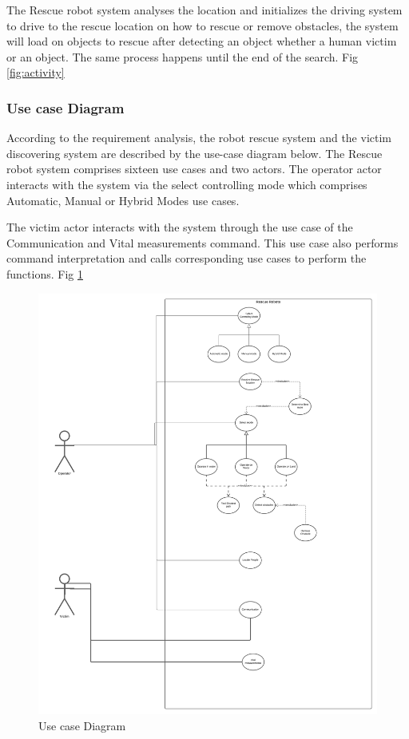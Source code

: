 \documentclass[10pt,journal,compsoc]{IEEEtran}
\begin{document}
The Rescue robot system analyses the location and initializes the driving system to drive to the rescue location on how to rescue or remove obstacles, the system will load on objects to rescue after detecting an object whether a human victim or an object.  The same process happens until the end of the search. Fig \ref{fig:activity}

\subsubsection{Use case Diagram}

According to the requirement analysis, the robot rescue system and the victim discovering system are described by the use-case diagram below. The  Rescue robot system comprises sixteen use cases and two actors. The operator actor interacts with the system via the select controlling mode which comprises Automatic, Manual or Hybrid Modes use cases. 

The victim actor interacts with the system through the use case of the Communication and Vital measurements command. This use case also performs command interpretation and calls corresponding use cases to perform the functions. Fig \ref{fig:usecase}

\begin{figure}[h]
\includegraphics[scale=0.22]{UseCase}
\caption{Use case Diagram}
\label{fig:usecase}
\end{figure}
\end{document}
